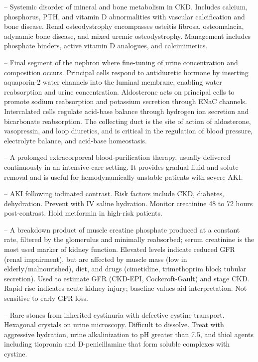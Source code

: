 -- Systemic disorder of mineral and bone metabolism in CKD. Includes calcium, phosphorus, PTH, and vitamin D abnormalities with vascular calcification and bone disease. Renal osteodystrophy encompasses osteitis fibrosa, osteomalacia, adynamic bone disease, and mixed uremic osteodystrophy. Management includes phosphate binders, active vitamin D analogues, and calcimimetics.

-- Final segment of the nephron where fine-tuning of urine concentration and composition occurs. Principal cells respond to antidiuretic hormone by inserting aquaporin-2 water channels into the luminal membrane, enabling water reabsorption and urine concentration. Aldosterone acts on principal cells to promote sodium reabsorption and potassium secretion through ENaC channels. Intercalated cells regulate acid-base balance through hydrogen ion secretion and bicarbonate reabsorption. The collecting duct is the site of action of aldosterone, vasopressin, and loop diuretics, and is critical in the regulation of blood pressure, electrolyte balance, and acid-base homeostasis.

-- A prolonged extracorporeal blood-purification therapy, usually delivered continuously in an intensive-care setting. It provides gradual fluid and solute removal and is useful for hemodynamically unstable patients with severe AKI.

-- AKI following iodinated contrast. Risk factors include CKD, diabetes, dehydration. Prevent with IV saline hydration. Monitor creatinine 48 to 72 hours post-contrast. Hold metformin in high-risk patients.

-- A breakdown product of muscle creatine phosphate produced at a constant rate, filtered by the glomerulus and minimally reabsorbed; serum creatinine is the most used marker of kidney function. Elevated levels indicate reduced GFR (renal impairment), but are affected by muscle mass (low in elderly/malnourished), diet, and drugs (cimetidine, trimethoprim block tubular secretion). Used to estimate GFR (CKD-EPI, Cockcroft-Gault) and stage CKD. Rapid rise indicates acute kidney injury; baseline values aid interpretation. Not sensitive to early GFR loss.

-- Rare stones from inherited cystinuria with defective cystine transport. Hexagonal crystals on urine microscopy. Difficult to dissolve. Treat with aggressive hydration, urine alkalinization to pH greater than 7.5, and thiol agents including tiopronin and D-penicillamine that form soluble complexes with cystine.

